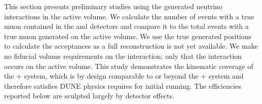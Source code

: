 This section presents preliminary studies using the generated neutrino interactions in the  active volume. We calculate the number of events with a true muon contained in the  and  detectors and compare it to the total events with a true muon generated on the active  volume. We use the true generated positions to calculate the acceptances as a full reconstruction is not yet available. We make no fiducial volume requirements on the  interaction; only that the interaction occurs on the active  volume. This study demonstrates the kinematic coverage of the + system, which is by design comparable to or beyond the + system and therefore satisfies DUNE physics requires for initial running. The efficiencies reported below are sculpted largely by detector effects.   

